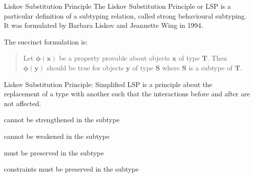 \documentclass[aspectratio=169]{beamer}
\begin{document}
\begin{frame}{Liskov Substitution Principle}
    The Liskov Substitution Principle or \alert{LSP} is a particular definition of a subtyping relation, called strong behavioural subtyping.
    It was formulated by Barbara Liskov and Jeannette Wing in 1994. \cite{liskov_behavioral_1994}
    
    The succinct formulation is:
    \begin{quote}
        Let $\mathbf{\phi(x)}$ be a property provable about objects $\mathbf{x}$ of type $\mathbf{T}$. Then $\mathbf{\phi(y)}$ should be true for objects $\mathbf{y}$ of type $\mathbf{S}$ where $\mathbf{S}$ is a subtype of $\mathbf{T}$.
    \end{quote}
\end{frame}
\begin{frame}{Liskov Substitution Principle: Simplified}
    LSP is a principle about the replacement of a type with another such that the interactions before and after are not affected.

    \begin{description}
        \item[Pre-conditions] cannot be strengthened in the subtype
        \item[Post-conditions] cannot be weakened in the subtype
        \item[Invariants] must be preserved in the subtype
        \item[History rule] constraints must be preserved in the subtype
    \end{description}
\end{frame}
\end{document}
